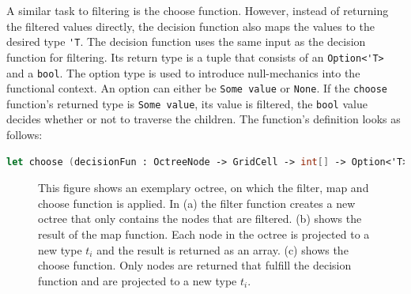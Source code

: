 A similar task to filtering is the choose function. However, instead of returning the filtered values directly, the decision function also maps the values to the desired type \verb|'T|. The decision function uses the same input as the decision function for filtering. Its return type is a tuple that consists of an \verb|Option<'T>| and a \verb|bool|. The option type is used to introduce null-mechanics into the functional context. An option can either be \verb|Some value| or \verb|None|. If the \verb|choose| function's returned type is \verb|Some value|, its value is filtered, the \verb|bool| value decides whether or not to traverse the children. 
The function's definition looks as follows: 

\begin{lstlisting}[language = FSharp]
let choose (decisionFun : OctreeNode -> GridCell -> int[] -> Option<'T>*bool) (tree: Octree) :('T[]) = ...
\end{lstlisting}


\begin{figure}[h]
    \centering
    \par\medskip
    \par\medskip        
    \caption[Filter, map, and choose applied to an exemplary octree]
		{This figure shows an exemplary octree, on which the filter, map and choose function is applied. In (a) the filter function creates a new octree that only contains the nodes that are filtered. (b) shows the result of the map function. Each node in the octree is projected to a new type $t_{i}$ and the result is returned as an array. (c) shows the choose function. Only nodes are returned that fulfill the decision function and are projected to a new type $t_{i}$. }
    \label{fig:octreeFuns}
\end{figure}

